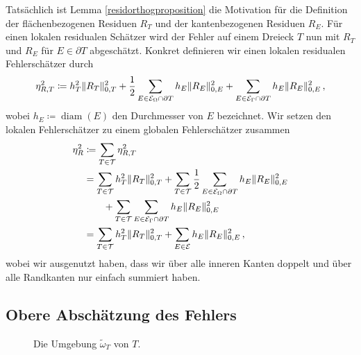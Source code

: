 \documentclass{scrartcl}
\newcommand{\cE}{\mathcal{E}}
\newcommand{\cT}{\mathcal{T}}
\DeclareMathOperator{\diam}{diam}         %
\DeclarePairedDelimiter{\norm}{\lVert}{\rVert}
\begin{document}
Tatsächlich ist Lemma \ref{residorthogproposition} die Motivation für die Definition der flächenbezogenen Residuen $R_T$ und der kantenbezogenen Residuen $R_E$.
Für einen lokalen residualen Schätzer wird der Fehler auf einem Dreieck $T$ nun mit $R_T$ und $R_E$ für $E\in\partial T$ abgeschätzt.
Konkret definieren wir einen lokalen residualen Fehlerschätzer durch
\begin{align}
	\eta_{R,T}^2\coloneqq h_T^2\norm{R_T}_{0,T}^2+\frac{1}{2}\sum_{E\in\cE_\Omega\cap\partial T}h_E\norm{R_E}_{0,E}^2+\sum_{E\in\cE_\Gamma\cap\partial T}h_E\norm{R_E}_{0,E}^2\,,
	\label{eq:DefinitionEtaRT}
\end{align}
wobei $h_E\coloneqq\diam(E)$ den Durchmesser von $E$ bezeichnet.
Wir setzen den lokalen Fehlerschätzer zu einem globalen Fehlerschätzer zusammen
\begin{align}
	\begin{aligned}
	\eta_R^2 
	&\coloneqq \sum_{T\in\cT}\eta_{R,T}^2 \\
	&= \sum_{T\in\cT}h_T^2\norm{R_T}_{0,T}^2+\sum_{T\in\cT}\frac{1}{2}\sum_{E\in\cE_\Omega\cap\partial T}h_E\norm{R_E}_{0,E}^2 \\
	&\qquad+\sum_{T\in\cT}\sum_{E\in\cE_\Gamma\cap\partial T}h_E\norm{R_E}_{0,E}^2 \\
	&= \sum_{T\in\cT}h_T^2\norm{R_T}_{0,T}^2+\sum_{E\in\cE}h_E\norm{R_E}_{0,E}^2\,,
	\end{aligned}
	\label{eq:DefinitionEtaR}
\end{align}
wobei wir ausgenutzt haben, dass wir über alle inneren Kanten doppelt und über alle Randkanten nur einfach summiert haben.

\newpage

\subsection{Obere Abschätzung des Fehlers}
\begin{figure}
\centering

\caption{Die Umgebung $\tilde{\omega}_T$ von $T$.}
\end{figure}
\end{document}
